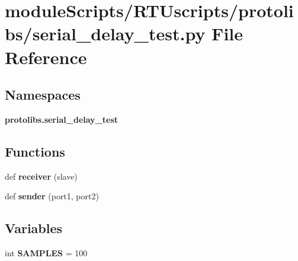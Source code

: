\section{module\+Scripts/\+R\+T\+Uscripts/protolibs/serial\+\_\+delay\+\_\+test.py File Reference}
\label{serial__delay__test_8py}
\subsection*{Namespaces}
\begin{DoxyCompactItemize}
\item 
 {\bf protolibs.\+serial\+\_\+delay\+\_\+test}
\end{DoxyCompactItemize}
\subsection*{Functions}
\begin{DoxyCompactItemize}
\item 
def {\bf receiver} (slave)
\item 
def {\bf sender} (port1, port2)
\end{DoxyCompactItemize}
\subsection*{Variables}
\begin{DoxyCompactItemize}
\item 
int {\bf S\+A\+M\+P\+L\+E\+S} = 100
\end{DoxyCompactItemize}
